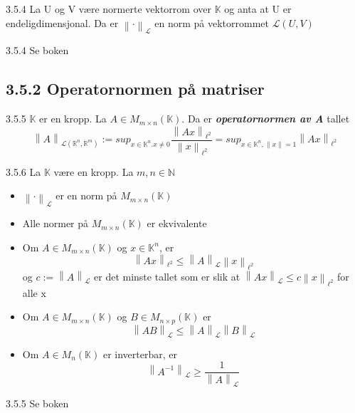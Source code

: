 \documentclass[a4paper,norsk]{article}
\renewcommand{\geq}{\geqslant}
\renewcommand{\leq}{\leqslant}
\begin{document}
\begin{propositionbox}{3.5.4}{}
La U og V være normerte vektorrom over $ \mathbb{K} $ og anta at U er endeligdimensjonal. Da er $ \left\lVert \cdot \right\rVert_{\mathcal{L}}  $  en norm på vektorrommet $ \mathcal{L} \left( U, V \right)  $ 

\begin{proofbox}{3.5.4}{}
Se boken
\end{proofbox}
\end{propositionbox}


\subsection*{3.5.2 Operatornormen på matriser}

\begin{definitionbox}{3.5.5}{}
$ \mathbb{K} $ er en kropp. La $ A \in M_{m \times n} (\mathbb{K}) $. Da er \textbf{\textit{operatornormen av A}} tallet
\[
    \left\lVert A \right\rVert _{\mathcal{L} \left( \mathbb{R}^n, \mathbb{R}^m \right) } := sup_{x \in  \mathbb{K}^n. x\neq 0} \frac{ \left\lVert Ax \right\rVert _{\ell^2} }{ \left\lVert x \right\rVert _{\ell^2} } = sup_{x \in \mathbb{K}^n, \left\lVert x \right\rVert =1} \left\lVert Ax \right\rVert _{\ell^2}
\]
\end{definitionbox}

\begin{theorembox}{3.5.6}{}
La $ \mathbb{K} $ være en kropp. La $ m, n \in \mathbb{N} $ 
\begin{itemize}
    \item $ \left\lVert \cdot \right\rVert _{\mathcal{L}} $ er en norm på $ M_{m \times n} (\mathbb{K}) $ 
    \item Alle normer på $ M_{m \times n} (\mathbb{K}) $ er ekvivalente
    \item Om $ A \in M_{m \times n} (\mathbb{K}) $ og $ x \in \mathbb{K}^n $, er 
    \[
        \left\lVert Ax \right\rVert _{\ell^2} \leq \left\lVert A \right\rVert _{\mathcal{L}} \left\lVert x \right\rVert _{\ell^2}
    \]
    og $ c:= \left\lVert A \right\rVert _{\mathcal{L}} $ er det minste tallet som er slik at $ \left\lVert Ax \right\rVert _{\mathcal{L}} \leq c \left\lVert x \right\rVert _{\ell^2} $ for alle x
    \item Om $ A \in M_{m \times n} (\mathbb{K}) $ og $ B \in M_{n \times p} (\mathbb{K}) $ er
    \[
        \left\lVert AB \right\rVert _{\mathcal{L}} \leq \left\lVert A \right\rVert _{\mathcal{L}} \left\lVert B \right\rVert _{\mathcal{L}}
    \]
    \item Om $ A \in M_n (\mathbb{K}) $ er inverterbar, er 
    \[
        \left\lVert A^{-1} \right\rVert _{\mathcal{L}} \geq \frac{ 1 }{ \left\lVert A \right\rVert _{\mathcal{L}} }
    \]
\end{itemize}

\begin{proofbox}{3.5.5}{}
    Se boken
\end{proofbox}
\end{theorembox}
\end{document}
